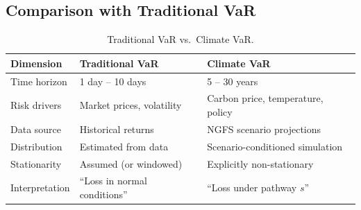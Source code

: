 \documentclass[11pt, a4paper]{article}
\theoremstyle{definition}
\theoremstyle{plain}
\theoremstyle{remark}
\begin{document}
\subsection{Comparison with Traditional VaR}

\begin{table}[H]
\centering
\caption{Traditional VaR vs.\ Climate VaR.}
\label{tab:var-comparison}
\begin{tabular}{@{}p{3.5cm}p{5cm}p{5cm}@{}}
\toprule
\textbf{Dimension} & \textbf{Traditional VaR} & \textbf{Climate VaR} \\
\midrule
Time horizon & 1 day -- 10 days & 5 -- 30 years \\
Risk drivers & Market prices, volatility & Carbon price, temperature, policy \\
Data source & Historical returns & NGFS scenario projections \\
Distribution & Estimated from data & Scenario-conditioned simulation \\
Stationarity & Assumed (or windowed) & Explicitly non-stationary \\
Interpretation & ``Loss in normal conditions'' & ``Loss under pathway $s$'' \\
\bottomrule
\end{tabular}
\end{table}
\end{document}
